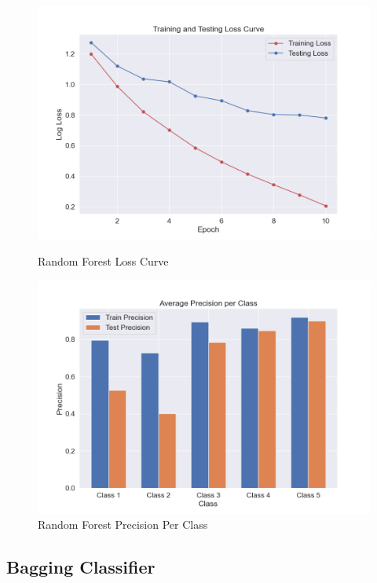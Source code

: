 \begin{figure}[H]
	\vspace{1em}
	
	\begin{minipage}[b]{0.45\textwidth}
		\centering
		\includegraphics[width=\textwidth]{img/paper_1/loss_curve.png}
		\caption{Random Forest Loss Curve}
	\end{minipage}
	\hfill
	\begin{minipage}[b]{0.45\textwidth}
		\centering
		\includegraphics[width=\textwidth]{img/paper_1/precision_per_class.png}
		\caption{Random Forest Precision Per Class}
	\end{minipage}
\end{figure}


\subsection{Bagging Classifier}

